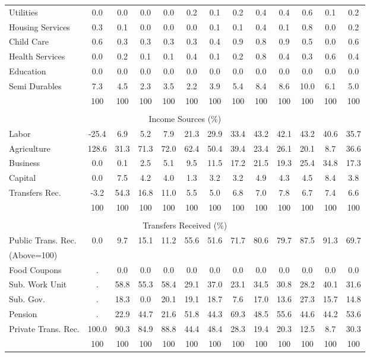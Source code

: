 \begin{tabular}{l c c c| c c c c c| c c c| c}
Utilities    & 0.0 & 0.0 & 0.0 & 0.0 & 0.2 & 0.1 & 0.2 & 0.4 & 0.4 & 0.6 & 0.1 & 0.2 \\
Housing Services  & 0.3 & 0.1 & 0.0 & 0.0 & 0.0 & 0.1 & 0.1 & 0.4 & 0.1 & 0.8 & 0.0 & 0.2 \\
Child Care   & 0.6 & 0.3 & 0.3 & 0.3 & 0.3 & 0.4 & 0.9 & 0.8 & 0.9 & 0.5 & 0.0 & 0.6 \\
Health Services    & 0.0 & 0.2 & 0.1 & 0.1 & 0.4 & 0.1 & 0.2 & 0.8 & 0.4 & 0.3 & 0.6 & 0.4 \\
Education   & 0.0 & 0.0 & 0.0 & 0.0 & 0.0 & 0.0 & 0.0 & 0.0 & 0.0 & 0.0 & 0.0 & 0.0 \\
Semi Durables     & 7.3 & 4.5 & 2.3 & 3.5 & 2.2 & 3.9 & 5.4 & 8.4 & 8.6 & 10.0 & 6.1 & 5.0 \\
\midrule
 & 100 & 100 & 100 & 100 & 100 & 100 & 100 & 100 & 100 & 100 & 100 & 100 \\
\midrule \\
\multicolumn{13}{c}{Income Sources (\%)}  \\
\midrule
Labor        & -25.4 & 6.9 & 5.2 & 7.9 & 21.3 & 29.9 & 33.4 & 43.2 & 42.1 & 43.2 & 40.6 & 35.7 \\
Agriculture  & 128.6 & 31.3 & 71.3 & 72.0 & 62.4 & 50.4 & 39.4 & 23.4 & 26.1 & 20.1 & 8.7 & 36.6 \\
Business     & 0.0 & 0.1 & 2.5 & 5.1 & 9.5 & 11.5 & 17.2 & 21.5 & 19.3 & 25.4 & 34.8 & 17.3 \\
Capital      & 0.0 & 7.5 & 4.2 & 4.0 & 1.3 & 3.2 & 3.2 & 4.9 & 4.3 & 4.5 & 8.4 & 3.8 \\
Transfers Rec.  & -3.2 & 54.3 & 16.8 & 11.0 & 5.5 & 5.0 & 6.8 & 7.0 & 7.8 & 6.7 & 7.4 & 6.6 \\
\midrule
 & 100 & 100 & 100 & 100 & 100 & 100 & 100 & 100 & 100 & 100 & 100 & 100 \\
\midrule \\
\multicolumn{13}{c}{Transfers Received (\%)}  \\
\midrule
Public Trans. Rec.  & 0.0 & 9.7 & 15.1 & 11.2 & 55.6 & 51.6 & 71.7 & 80.6 & 79.7 & 87.5 & 91.3 & 69.7 \\
(Above=100) & & & & & & & & & & & &  \\
\hspace{.3cm} Food Coupons    & . & 0.0 & 0.0 & 0.0 & 0.0 & 0.0 & 0.0 & 0.0 & 0.0 & 0.0 & 0.0 & 0.0 \\
\hspace{.3cm} Sub. Work Unit  & . & 58.8 & 55.3 & 58.4 & 29.1 & 37.0 & 23.1 & 34.5 & 30.8 & 28.2 & 40.1 & 31.6 \\
\hspace{.3cm} Sub. Gov.       & . & 18.3 & 0.0 & 20.1 & 19.1 & 18.7 & 7.6 & 17.0 & 13.6 & 27.3 & 15.7 & 14.8 \\
\hspace{.3cm} Pension         & . & 22.9 & 44.7 & 21.6 & 51.8 & 44.3 & 69.3 & 48.5 & 55.6 & 44.6 & 44.2 & 53.6 \\
Private Trans. Rec. & 100.0 & 90.3 & 84.9 & 88.8 & 44.4 & 48.4 & 28.3 & 19.4 & 20.3 & 12.5 & 8.7 & 30.3 \\
\midrule
 & 100 & 100 & 100 & 100 & 100 & 100 & 100 & 100 & 100 & 100 & 100 & 100 \\
\bottomrule
\end{tabular}